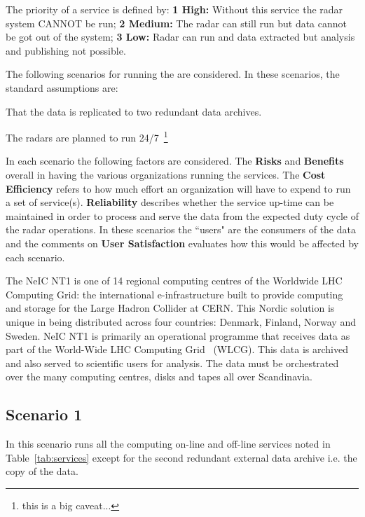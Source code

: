 \documentclass[12pt,a4paper]{article}
\newcommand{\nnt}{NeIC NT1\xspace}
\begin{document}
The priority of a service is defined by: {\bf 1 High:} Without this service the radar system CANNOT be run; {\bf 2 Medium:} The radar can still run but data cannot be got out of the system; {\bf 3 Low:} Radar can run and data extracted but analysis and publishing not possible.

The following scenarios for running the \ED \einfra are considered.
In these scenarios, the standard assumptions are:
\bitm
\item That the \ED data is replicated to two redundant data archives.
\item The \ED radars are planned to run 24/7~\footnote{this is a big caveat...}
\eitm

In each scenario the following factors are considered.
The {\bf Risks} and {\bf Benefits} overall in having the various organizations running the services.
The {\bf Cost Efficiency} refers to how much effort an organization will have to expend to run a set of service(s).
{\bf Reliability} describes whether the service up-time can be maintained in order to process and serve the data from the expected duty cycle of the radar operations.
In these scenarios the ``users" are the consumers of the \ED data and the comments on {\bf User Satisfaction} evaluates how this would be affected by each scenario.

The \nnt is one of 14 regional computing centres of the Worldwide LHC Computing Grid:
the international e-infrastructure built to provide computing and storage for the Large Hadron Collider at CERN.
This Nordic solution is unique in being distributed across four countries: Denmark, Finland, Norway and Sweden.
\nnt is primarily an \einfra operational programme that receives data as part of the World-Wide LHC Computing Grid~\cite{wlcg} (WLCG).
This data is archived and also served to scientific users for analysis.
The data must be orchestrated over the many computing centres, disks and tapes all over Scandinavia.


\subsection{Scenario 1}
\label{ssec:scen1}

In this scenario \EC runs all the computing on-line and off-line services noted in Table~\ref{tab:services} except for the second redundant external data archive i.e. the copy of the \ED data.
\end{document}
